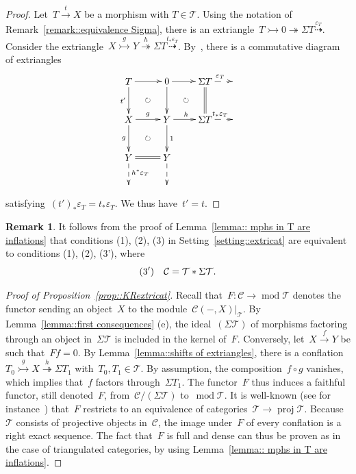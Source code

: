 \documentclass{amsart}
\theoremstyle{definition}
\newtheorem{remark}[theorem]{Remark}
\newcommand{\cat}{\mathcal{C}}
\newcommand{\susp}{\Sigma}
\newcommand{\MOD}{\operatorname{mod}}
\newcommand{\proj}{\operatorname{proj}}
\newcommand{\tc}{\mathcal{T}}
\newcommand{\infl}{\rightarrowtail}
\newcommand{\defl}{\twoheadrightarrow}
\newcommand{\modt}{\MOD\tc}
\newcommand{\eps}{\varepsilon}
\begin{document}
\begin{proof}
Let~$T \overset{t}{\to} X$ be a morphism with $T\in \tc$.
Using the notation of Remark~\ref{remark::equivalence Sigma}, there is an extriangle~$T\infl 0\defl \susp T \overset{\eps_T}{\dashrightarrow}$.
Consider the extriangle~$X\overset{g}{\infl} Y \overset{h}{\defl} \susp T \overset{t_\ast\eps_T}{\dashrightarrow}$.
By~\cite[Proposition 3.17]{NakaokaPalu}, there is a commutative diagram of extriangles
\[
\xy
(-7,7)*+{T}="2";
(7,7)*+{0}="4";
(21,7)*+{\susp T}="6";
(32,7)*+{}="8";
%
(-7,-7)*+{X}="12";
(7,-7)*+{Y}="14";
(21,-7)*+{\susp T}="16";
(32,-7)*+{}="18";
%
(-7,-21)*+{Y}="22";
(7,-21)*+{Y}="24";
%
(-7,-32)*+{}="32";
(7,-32)*+{}="34";
%
{\ar@{->} "2";"4"};
{\ar@{->} "4";"6"};
{\ar@{-->}^{\eps_T} "6";"8"};
%
{\ar@{->}_{t'} "2";"12"};
{\ar "4";"14"};
{\ar@{=} "6";"16"};
%
{\ar^{g} "12";"14"};
{\ar^{h} "14";"16"};
{\ar@{-->}^{t_\ast\eps_T} "16";"18"};
%
{\ar_{g} "12";"22"};
{\ar^{1} "14";"24"};
%
{\ar@{=} "22";"24"};
%
{\ar@{-->}^{h^\ast\eps_T} "22";"32"};
{\ar@{-->} "24";"34"};
%
{\ar@{}|\circlearrowright "2";"14"};
{\ar@{}|\circlearrowright "4";"16"};
{\ar@{}|\circlearrowright "12";"24"};
\endxy
\]
satisfying~$(t')_\ast\eps_T=t_\ast\eps_T$.
We thus have~$t'=t$.
\end{proof}

\begin{remark}
 It follows from the proof of Lemma~\ref{lemma:: mphs in T are inflations} that conditions (1), (2), (3) in Setting~\ref{setting::extricat} are equivalent to conditions (1), (2), (3'), where
\[
{\rm (3')} \ \ \ \cat = \tc\ast\susp\tc.
\]
\end{remark}


\begin{proof}[Proof of Proposition~\ref{prop::KRextricat}]
Recall that~$F:\cat\to\modt$ denotes the functor sending an object~$X$ to the module~$\cat(-,X)|_\tc$.
By Lemma~\ref{lemma::first consequences} (e), the ideal~$(\susp\tc)$ of morphisms factoring through an object in~$\susp\tc$ is included in the kernel of~$F$.
Conversely, let~$X\xrightarrow{f}Y$ be such that~$Ff=0$.
By Lemma~\ref{lemma::shifts of extriangles}, there is a conflation~$T_0\overset{g}{\infl} X\overset{h}{\defl} \susp T_1$ with~$T_0,T_1\in\tc$.
By assumption, the composition~$f\circ g$ vanishes, which implies that~$f$ factors through~$\susp T_1$.
The functor~$F$ thus induces a faithful functor, still denoted~$F$, from~$\cat/(\susp\tc)$ to~$\modt$.
It is well-known (see for instance~\cite[Lemma 3.1]{AssemSimsonSkowronski}) that~$F$ restricts to an equivalence of categories~$\tc\to\proj\tc$.
Because~$\tc$ consists of projective objects in~$\cat$, the image under~$F$ of every conflation is a right exact sequence.
The fact that~$F$ is full and dense can thus be proven as in the case of triangulated categories, by using Lemma~\ref{lemma:: mphs in T are inflations}.
\end{proof}
\end{document}
